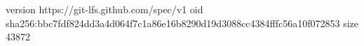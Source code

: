 version https://git-lfs.github.com/spec/v1
oid sha256:bbc7fdf824dd3a4d064f7c1a86e16b8290d19d3088cc4384fffc56a10f072853
size 43872
